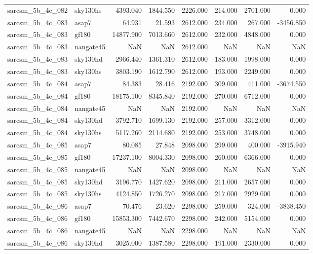 \begin{tabular}{llrrrrrr}
sarcsm\_5b\_4c\_082 & sky130hs & 4393.040 & 1844.550 & 2226.000 & 214.000 & 2701.000 & 0.000 \\
sarcsm\_5b\_4c\_083 & asap7 & 64.931 & 21.593 & 2612.000 & 234.000 & 267.000 & -3456.850 \\
sarcsm\_5b\_4c\_083 & gf180 & 14877.900 & 7013.660 & 2612.000 & 232.000 & 4848.000 & 0.000 \\
sarcsm\_5b\_4c\_083 & nangate45 & NaN & NaN & 2612.000 & NaN & NaN & NaN \\
sarcsm\_5b\_4c\_083 & sky130hd & 2966.440 & 1361.310 & 2612.000 & 183.000 & 1998.000 & 0.000 \\
sarcsm\_5b\_4c\_083 & sky130hs & 3803.190 & 1612.790 & 2612.000 & 193.000 & 2249.000 & 0.000 \\
sarcsm\_5b\_4c\_084 & asap7 & 84.383 & 28.416 & 2192.000 & 309.000 & 411.000 & -3674.550 \\
sarcsm\_5b\_4c\_084 & gf180 & 18175.100 & 8345.840 & 2192.000 & 270.000 & 6712.000 & 0.000 \\
sarcsm\_5b\_4c\_084 & nangate45 & NaN & NaN & 2192.000 & NaN & NaN & NaN \\
sarcsm\_5b\_4c\_084 & sky130hd & 3792.710 & 1699.130 & 2192.000 & 257.000 & 3312.000 & 0.000 \\
sarcsm\_5b\_4c\_084 & sky130hs & 5117.260 & 2114.680 & 2192.000 & 253.000 & 3748.000 & 0.000 \\
sarcsm\_5b\_4c\_085 & asap7 & 80.085 & 27.848 & 2098.000 & 299.000 & 400.000 & -3915.940 \\
sarcsm\_5b\_4c\_085 & gf180 & 17237.100 & 8004.330 & 2098.000 & 260.000 & 6366.000 & 0.000 \\
sarcsm\_5b\_4c\_085 & nangate45 & NaN & NaN & 2098.000 & NaN & NaN & NaN \\
sarcsm\_5b\_4c\_085 & sky130hd & 3196.770 & 1427.620 & 2098.000 & 211.000 & 2657.000 & 0.000 \\
sarcsm\_5b\_4c\_085 & sky130hs & 4124.850 & 1726.270 & 2098.000 & 217.000 & 2929.000 & 0.000 \\
sarcsm\_5b\_4c\_086 & asap7 & 70.476 & 23.620 & 2298.000 & 259.000 & 324.000 & -3838.450 \\
sarcsm\_5b\_4c\_086 & gf180 & 15853.300 & 7442.670 & 2298.000 & 242.000 & 5154.000 & 0.000 \\
sarcsm\_5b\_4c\_086 & nangate45 & NaN & NaN & 2298.000 & NaN & NaN & NaN \\
sarcsm\_5b\_4c\_086 & sky130hd & 3025.000 & 1387.580 & 2298.000 & 191.000 & 2330.000 & 0.000 \\

\end{tabular}
